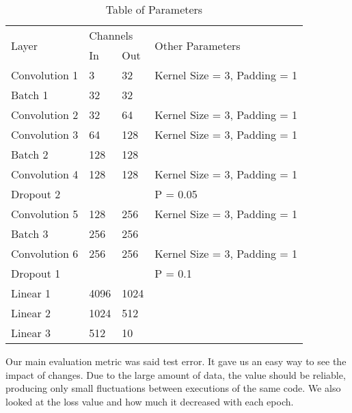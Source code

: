 \documentclass[journal]{IEEEtran}
\begin{document}
\begin{table}[!hbt]
\centering
\caption{Table of Parameters}
\label{table:1}
\begin{tabular}{@{}llll@{}}
\toprule
\multirow{2}{*}{Layer} & \multicolumn{2}{l}{Channels} & \multirow{2}{*}{Other Parameters} \\ \cmidrule(lr){2-3}
              & In   & Out  &                              \\ \midrule
Convolution 1 & 3    & 32   & Kernel Size = 3, Padding = 1 \\
Batch 1       & 32   & 32   &                              \\
Convolution 2 & 32   & 64   & Kernel Size = 3, Padding = 1 \\ \midrule
Convolution 3 & 64   & 128  & Kernel Size = 3, Padding = 1 \\
Batch 2       & 128  & 128  &                              \\
Convolution 4 & 128  & 128  & Kernel Size = 3, Padding = 1 \\
Dropout 2     &      &      & P = 0.05                     \\ \midrule
Convolution 5 & 128  & 256  & Kernel Size = 3, Padding = 1 \\
Batch 3       & 256  & 256  &                              \\
Convolution 6 & 256  & 256  & Kernel Size = 3, Padding = 1 \\ \midrule
Dropout 1     &      &      & P = 0.1                      \\
Linear 1      & 4096 & 1024 &                              \\
Linear 2      & 1024 & 512  &                              \\
Linear 3      & 512  & 10   &                              \\ \bottomrule
\end{tabular}
\end{table}

Our main evaluation metric was said test error. It gave us an easy way to see the impact of changes. Due to the large amount of data, the value should be reliable, producing only small fluctuations between executions of the same code. We also looked at the loss value and how much it decreased with each epoch. 
\end{document}
